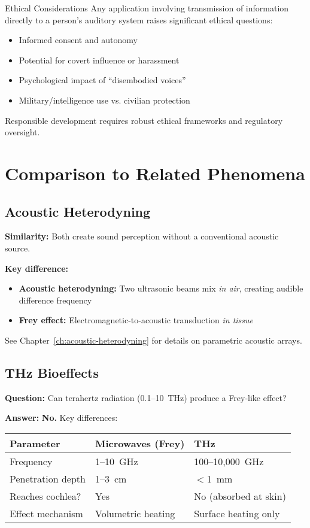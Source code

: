 \begin{calloutbox}{Ethical Considerations}
Any application involving transmission of information directly to a person's auditory system raises significant ethical questions:
\begin{itemize}
\item Informed consent and autonomy
\item Potential for covert influence or harassment
\item Psychological impact of ``disembodied voices''
\item Military/intelligence use vs. civilian protection
\end{itemize}

Responsible development requires robust ethical frameworks and regulatory oversight.
\end{calloutbox}

\section{Comparison to Related Phenomena}

\subsection{Acoustic Heterodyning}
\label{subsec:frey-vs-heterodyning}

\textbf{Similarity:} Both create sound perception without a conventional acoustic source.

\textbf{Key difference:}
\begin{itemize}
\item \textbf{Acoustic heterodyning:} Two ultrasonic beams mix \emph{in air}, creating audible difference frequency
\item \textbf{Frey effect:} Electromagnetic-to-acoustic transduction \emph{in tissue}
\end{itemize}

See Chapter~\ref{ch:acoustic-heterodyning} for details on parametric acoustic arrays.

\subsection{THz Bioeffects}

\textbf{Question:} Can terahertz radiation (0.1--10~THz) produce a Frey-like effect?

\textbf{Answer:} \textbf{No.} Key differences:

\begin{center}
\begin{tabular}{@{}lll@{}}
\toprule
\textbf{Parameter} & \textbf{Microwaves (Frey)} & \textbf{THz} \\
\midrule
Frequency & 1--10~GHz & 100--10,000~GHz \\
Penetration depth & 1--3~cm & $<$1~mm \\
Reaches cochlea? & Yes & No (absorbed at skin) \\
Effect mechanism & Volumetric heating & Surface heating only \\
\bottomrule
\end{tabular}
\end{center}

